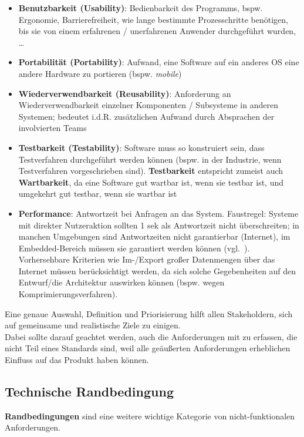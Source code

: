 \begin{itemize}
    \item \textbf{Benutzbarkeit (Usability)}: Bedienbarkeit des Programms, bspw. Ergonomie, Barrierefreiheit, wie lange bestimmte Prozesschritte benötigen, bis sie von einem erfahrenen / unerfahrenen Anwender durchgeführt wurden, \ldots
    \item \textbf{Portabilität (Portability)}: Aufwand, eine Software auf ein anderes OS eine andere Hardware zu portieren (bspw. \textit{mobile})
    \item \textbf{Wiederverwendbarkeit (Reusability)}: Anforderung an Wiederverwendbarkeit einzelner Komponenten / Subsysteme in anderen Systemen; bedeutet i.d.R. zusätzlichen Aufwand durch Absprachen der involvierten Teams
    \item \textbf{Testbarkeit (Testability)}: Software muss so konstruiert sein, dass Testverfahren durchgeführt werden können (bspw. in der Industrie, wenn Testverfahren vorgeschrieben sind). \textbf{Testbarkeit} entspricht zumeist auch \textbf{Wartbarkeit}, da eine Software gut wartbar ist, wenn sie testbar ist, und umgekehrt gut testbar, wenn sie wartbar ist
    \item \textbf{Performance}: Antwortzeit bei Anfragen an das System.
    Faustregel: Systeme mit direkter Nutzeraktion sollten 1 sek als Antwortzeit nicht überschreiten; in manchen Umgebungen sind Antwortzeiten nicht garantierbar (Internet), im Embedded-Bereich müssen sie garantiert werden können (vgl.~\cite[62]{Wed09}).
    Vorhersehbare Kriterien wie Im-/Export großer Datenmengen über das Internet müssen berücksichtigt werden, da sich solche Gegebenheiten auf den Entwurf/die Architektur auswirken können (bspw. wegen Komprimierungsverfahren).
\end{itemize}


\noindent
Eine genaue Auswahl, Definition und Priorisierung hilft allen Stakeholdern, sich auf gemeinsame und realistische Ziele zu einigen.\\
Dabei sollte darauf geachtet werden, auch die Anforderungen mit zu erfassen, die nicht Teil eines Standards sind, weil alle geäußerten Anforderungen erheblichen Einfluss auf das Produkt haben können.


\subsection*{Technische Randbedingung}
\textbf{Randbedingungen} sind eine weitere wichtige Kategorie von nicht-funktionalen Anforderungen.\\

